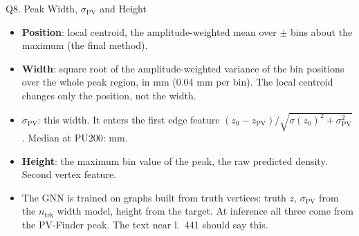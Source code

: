 \begin{frame}{Q8. Peak Width, $\sigma_\mathrm{PV}$ and Height}
\small
\begin{itemize}\setlength\itemsep{.4em}
\item \textbf{Position}: local centroid, the amplitude-weighted mean over $\pm$\hlCentroid{} bins about the maximum (the final method).
\item \textbf{Width}: square root of the amplitude-weighted variance of the bin positions over the whole peak region, in mm (0.04 mm per bin). The local centroid changes only the position, not the width.
\item \textbf{$\sigma_\mathrm{PV}$}: this width. It enters the first edge feature $(z_0-z_\mathrm{PV})/\sqrt{\sigma(z_0)^2+\sigma_\mathrm{PV}^2}$. Median at PU200: \sigmaPVmed{} mm.
\item \textbf{Height}: the maximum bin value of the peak, the raw predicted density. Second vertex feature.
\item The GNN is trained on graphs built from truth vertices: truth $z$, $\sigma_\mathrm{PV}$ from the $n_\mathrm{trk}$ width model, height from the target. At inference all three come from the PV-Finder peak. The text near l.~441 should say this.
\end{itemize}
\end{frame}

